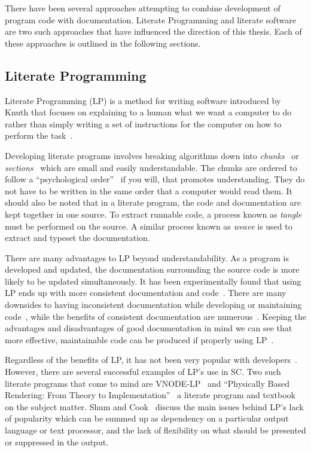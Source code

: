 There have been several approaches attempting to combine development of program 
code with documentation. Literate Programming and literate software are two 
such approaches that have influenced the direction of this thesis. Each of 
these approaches is outlined in the following sections.

\subsection{Literate Programming}

Literate Programming (LP) is a method for writing software introduced by Knuth 
that focuses on explaining to a human what we want a computer to do rather than 
simply writing a set of instructions for the computer on how to perform the 
task~\cite{Knuth1984}.

Developing literate programs involves breaking algorithms down into
\emph{chunks}~\cite{JohnsonAndJohnson1997} or \emph{sections}~\cite{Knuth1984}
which are small and easily understandable. The chunks are ordered to follow a 
``psychological order''~\cite{PieterseKourieAndBoake2004} if
you will, that promotes understanding. They do not have to be written in the 
same order that a computer would read them. It should also be noted that in a 
literate program, the code and documentation are kept together in one source. 
To extract runnable code, a process known as \emph{tangle} must be performed on 
the source. A similar process known as \emph{weave} is used to extract and 
typeset the documentation.

There are many advantages to LP beyond understandability. As a program is
developed and updated, the documentation surrounding the source code is more 
likely to be updated simultaneously. It has been experimentally found that 
using LP ends up with more consistent documentation and 
code~\cite{ShumAndCook1993}. There are many downsides to having inconsistent 
documentation while developing or maintaining 
code~\cite{Kotula2000,Thimbleby1986}, while the benefits of consistent 
documentation are numerous~\cite{Hyman1990, Kotula2000}. Keeping the advantages 
and disadvantages of good documentation in mind we can see that more effective, 
maintainable code can be produced if properly using 
LP~\cite{PieterseKourieAndBoake2004}.

Regardless of the benefits of LP, it has not been very popular with 
developers~\cite{ShumAndCook1993}. However, there are
several successful examples of LP's use in SC. Two such literate programs that 
come to mind are VNODE-LP~\cite{Nedialkov2006} and ``Physically Based 
Rendering: From Theory to Implementation''~\cite{PharrAndHumphreys2004} a 
literate program and textbook on the subject matter. Shum and 
Cook~\cite{ShumAndCook1993} discuss the main issues behind LP's lack of 
popularity which can be summed up as dependency on a 
particular output language or text processor, and the lack of flexibility on 
what should be presented or suppressed in the output.

